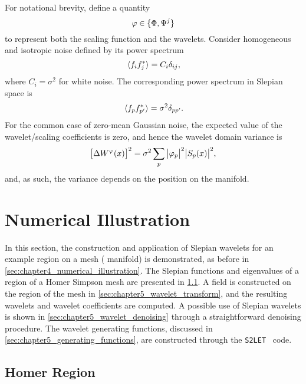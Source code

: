 For notational brevity, define a quantity
%
\begin{equation}
	\varphi \in \set{\Phi,\Psi^{j}}
\end{equation}
%
to represent both the scaling function and the wavelets.
Consider homogeneous and isotropic noise defined by its power spectrum
%
\begin{equation}
	\expval*{f_{i} \conj{f_{j}}}
	= C_{i} \delta_{i j},
\end{equation}
%
where \(C_{i} = \sigma^{2}\) for white noise.
The corresponding power spectrum in Slepian space is
%
\begin{equation}
	\expval*{\slepian{f} \conj{\slepian[']{f}}}
	= \sigma^{2} \delta_{pp'}.
\end{equation}
%
For the common case of zero-mean Gaussian noise, the expected value of the wavelet/scaling coefficients is zero, and hence the wavelet domain variance is
%
\begin{equation}
	\variance{\mesh{W^{\varphi}}}
	= \sigma^{2} \slepianSum \abs{\slepian{\varphi}}^{2} \abs{\mesh{\slepian{S}}}^{2},
\end{equation}
%
and, as such, the variance depends on the position on the manifold.

\section{Numerical Illustration}\label{sec:chapter5_numerical_illustration}

In this section, the construction and application of Slepian wavelets for an example region on a mesh (\cf{} manifold) is demonstrated, as before in \cref{sec:chapter4_numerical_illustration}.
The Slepian functions and eigenvalues of a region of a Homer Simpson mesh are presented in \cref{sec:chapter5_homer_region}.
A field is constructed on the region of the mesh in \cref{sec:chapter5_wavelet_transform}, and the resulting wavelets and wavelet coefficients are computed.
A possible use of Slepian wavelets is shown in \cref{sec:chapter5_wavelet_denoising} through a straightforward denoising procedure.
The wavelet generating functions, discussed in \cref{sec:chapter5_generating_functions}, are constructed through the \texttt{S2LET}~\cite{Leistedt2013} code.

\subsection{Homer Region}\label{sec:chapter5_homer_region}

